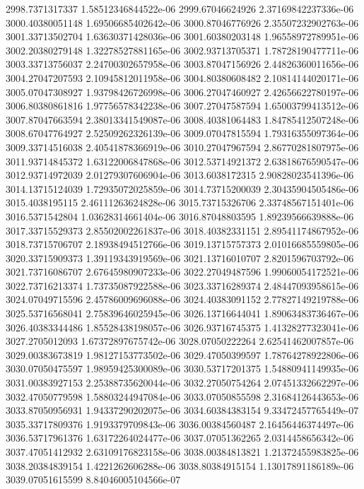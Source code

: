 {2998.7371317337 1.58512346844522e-06
2999.67046624926 2.37169842237336e-06
3000.40380051148 1.69506685402642e-06
3000.87046776926 2.35507232902763e-06
3001.33713502704 1.63630371428036e-06
3001.60380203148 1.96558972789951e-06
3002.20380279148 1.32278527881165e-06
3002.93713705371 1.78728190477711e-06
3003.33713756037 2.24700302657958e-06
3003.87047156926 2.44826360011656e-06
3004.27047207593 2.10945812011958e-06
3004.80380608482 2.10814144020171e-06
3005.07047308927 1.93798426726998e-06
3006.27047460927 2.42656622780197e-06
3006.80380861816 1.97756578342238e-06
3007.27047587594 1.65003799413512e-06
3007.87047663594 2.38013341549087e-06
3008.40381064483 1.84785412507248e-06
3008.67047764927 2.52509262326139e-06
3009.07047815594 1.79316355097364e-06
3009.33714516038 2.40541878366919e-06
3010.27047967594 2.86770281807975e-06
3011.93714845372 1.63122006847868e-06
3012.53714921372 2.63818676590547e-06
3012.93714972039 2.01279307606904e-06
3013.6038172315 2.90828023541396e-06
3014.13715124039 1.72935072025859e-06
3014.73715200039 2.30435904505486e-06
3015.4038195115 2.46111263624828e-06
3015.73715326706 2.33748567151401e-06
3016.5371542804 1.03628314661404e-06
3016.87048803595 1.89239566639888e-06
3017.33715529373 2.85502002261837e-06
3018.40382331151 2.89541174867952e-06
3018.73715706707 2.18938494512766e-06
3019.13715757373 2.01016685559805e-06
3020.33715909373 1.39119343919569e-06
3021.13716010707 2.8201596703792e-06
3021.73716086707 2.67645980907233e-06
3022.27049487596 1.99060054172521e-06
3022.73716213374 1.73735087922588e-06
3023.33716289374 2.48447093958615e-06
3024.07049715596 2.45786009696088e-06
3024.40383091152 2.77827149219788e-06
3025.53716568041 2.75839646025945e-06
3026.13716644041 1.89063483736467e-06
3026.40383344486 1.85528438198057e-06
3026.93716745375 1.41328277323041e-06
3027.2705012093 1.67372897675742e-06
3028.07050222264 2.62541462007857e-06
3029.00383673819 1.98127153773502e-06
3029.47050399597 1.78764278922806e-06
3030.07050475597 1.98959425300089e-06
3030.53717201375 1.54880941149935e-06
3031.00383927153 2.25388735620044e-06
3032.27050754264 2.07451332662297e-06
3032.47050779598 1.58803244947084e-06
3033.07050855598 2.31684126443653e-06
3033.87050956931 1.94337290202075e-06
3034.60384383154 9.33472457765449e-07
3035.33717809376 1.9193379709843e-06
3036.00384560487 2.16456446374497e-06
3036.53717961376 1.63172264024477e-06
3037.07051362265 2.0314458656342e-06
3037.47051412932 2.63109176823158e-06
3038.00384813821 1.21372455983825e-06
3038.20384839154 1.4221262606288e-06
3038.80384915154 1.13017891186189e-06
3039.07051615599 8.84046005104566e-07
}
